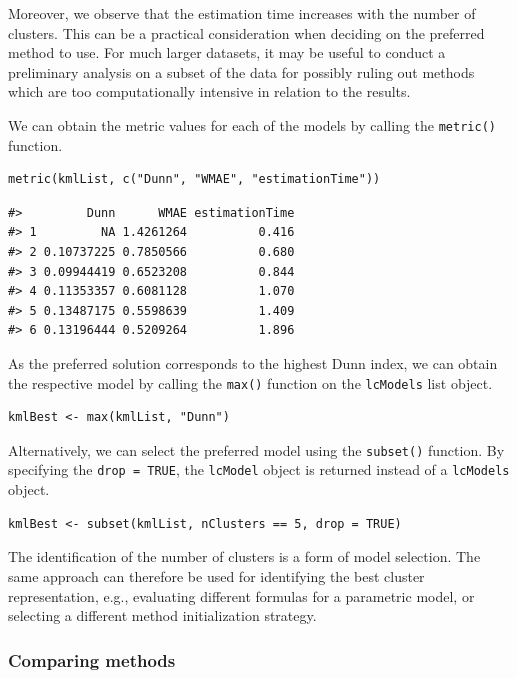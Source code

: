 Moreover, we observe that the estimation time increases with the number of clusters. This can be a practical consideration when deciding on the preferred method to use. For much larger datasets, it may be useful to conduct a preliminary analysis on a subset of the data for possibly ruling out methods which are too computationally intensive in relation to the results.

We can obtain the metric values for each of the models by calling the \texttt{metric()} function.

\begin{verbatim}
metric(kmlList, c("Dunn", "WMAE", "estimationTime"))
\end{verbatim}

\begin{verbatim}
#>         Dunn      WMAE estimationTime
#> 1         NA 1.4261264          0.416
#> 2 0.10737225 0.7850566          0.680
#> 3 0.09944419 0.6523208          0.844
#> 4 0.11353357 0.6081128          1.070
#> 5 0.13487175 0.5598639          1.409
#> 6 0.13196444 0.5209264          1.896
\end{verbatim}

As the preferred solution corresponds to the highest Dunn index, we can obtain the respective model by calling the \texttt{max()} function on the \texttt{lcModels} list object.

\begin{verbatim}
kmlBest <- max(kmlList, "Dunn")
\end{verbatim}

Alternatively, we can select the preferred model using the \texttt{subset()} function. By specifying the \texttt{drop\ =\ TRUE}, the \texttt{lcModel} object is returned instead of a \texttt{lcModels} object.

\begin{verbatim}
kmlBest <- subset(kmlList, nClusters == 5, drop = TRUE)
\end{verbatim}

The identification of the number of clusters is a form of model selection. The same approach can therefore be used for identifying the best cluster representation, e.g., evaluating different formulas for a parametric model, or selecting a different method initialization strategy.

\subsubsection{Comparing methods}\label{comparing-methods}

